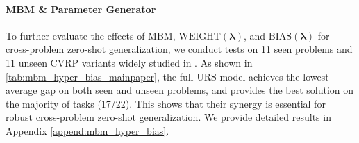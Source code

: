 \documentclass{article}
\theoremstyle{plain}
\theoremstyle{definition}
\theoremstyle{remark}
\begin{document}
\begin{table}[t]
  \centering
  \caption{Results comparing performance with and without MBM, $\mathrm{WEIGHT}(\bm{\lambda})$, and $\mathrm{BIAS}(\bm{\lambda})$ on seen and unseen variants.}
  \label{tab:mbm_hyper_bias_mainpaper}%
\end{table}%
\paragraph{MBM \& Parameter Generator}
To further evaluate the effects of MBM, $\mathrm{WEIGHT}(\bm{\lambda})$, and $\mathrm{BIAS}(\bm{\lambda})$ for cross-problem zero-shot generalization, we conduct tests on 11 seen problems and 11 unseen CVRP variants widely studied in \citep{liu2024mtpomo}. As shown in \cref{tab:mbm_hyper_bias_mainpaper}, the full URS model achieves the lowest average gap on both seen and unseen problems, and provides the best solution on the majority of tasks (17/22). This shows that their synergy is essential for robust cross-problem zero-shot generalization. We provide detailed results in Appendix \ref{append:mbm_hyper_bias}.
\end{document}
